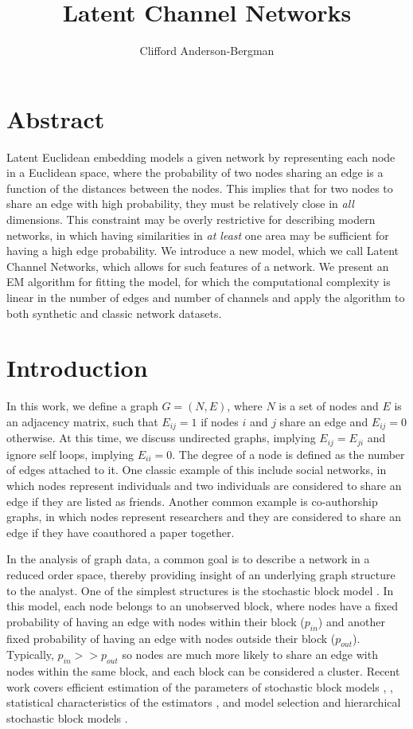 \documentclass[11pt]{amsart}
\title{Latent Channel Networks}
\author{Clifford Anderson-Bergman}
\begin{document}
\maketitle

\section{Abstract}

Latent Euclidean embedding models a given network by representing each node in a Euclidean 
space, where the probability of two nodes sharing an edge is a function of the distances between the nodes. 
This implies that for two nodes to share an edge with high probability, they must be relatively close in 
\emph{all} dimensions. This constraint may be overly restrictive for describing modern networks, in which having similarities 
in \emph{at least} one area may be sufficient for having a high edge probability. We introduce a new model, which we call 
Latent Channel Networks, which allows for such features of a network. We present an EM algorithm for fitting the model, 
for which the computational complexity is linear in the number of edges and number of channels
and apply the algorithm to both synthetic and classic network datasets. 

\section{Introduction}

In this work, we define a graph $G = (N, E)$, where $N$ is a set of nodes and 
$E$ is an adjacency matrix, such that $E_{ij} = 1$ if nodes $i$ and $j$ share an 
edge and $E_{ij} = 0$ otherwise. At this time, we discuss undirected graphs, implying $E_{ij} = E_{ji}$
and ignore self loops, implying $E_{ii} = 0$.
The degree of a node is defined as the number of edges attached to it. 
One classic example of this include social networks, in which nodes represent 
individuals and two individuals are considered to share an edge if they are listed as friends.
Another common example is co-authorship graphs, in which nodes represent researchers 
and they are considered to share an edge if they have coauthored a paper together. 

In the analysis of graph data, a common goal is to describe a network in a reduced order 
space, thereby providing insight of an underlying graph structure to the analyst. 
One of the simplest structures is the stochastic block model \cite{sbm}. 
In this model, each node belongs to an unobserved block, where nodes
have a fixed probability of having an edge with nodes within their block ($p_{in}$)
and another fixed probability of having an edge with nodes outside their block ($p_{out}$). 
Typically, $p_{in} >> p_{out}$ so nodes are much more likely to 
share an edge with nodes within the same block, and each block can be considered a cluster. 
Recent work  covers efficient estimation of the parameters of stochastic block models
\cite{sbmExact}, \cite{sbmSpec}, statistical characteristics of the estimators \cite{specConsist}, \cite{sbmAsym}
and model selection \cite{sbmSelection} and hierarchical stochastic block models \cite{nestedsbm}.
\end{document}
